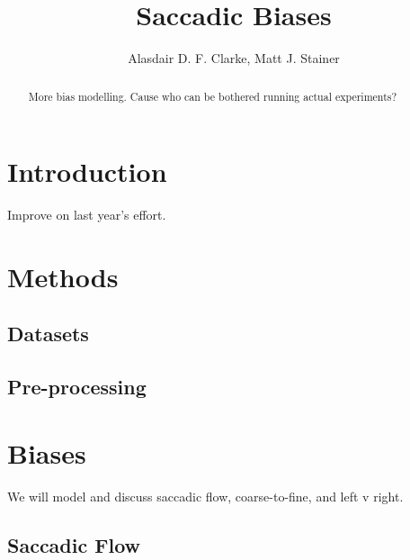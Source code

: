 \documentclass[a4paper, onecolumn, oneside, 11pt]{article}
\title{Saccadic Biases}
\author{Alasdair D. F. Clarke, Matt J. Stainer}
\begin{document}
\maketitle

\begin{abstract}
More bias modelling. Cause who can be bothered running actual experiments?
\end{abstract}


\section{Introduction}

Improve on last year's \citep{clarke-tatler2014} effort. 

\section{Methods}

\subsection{Datasets}

\subsection{Pre-processing}

\section{Biases}

We will model and discuss saccadic flow, coarse-to-fine, and left v right. 

\subsection{Saccadic Flow}
\end{document}
